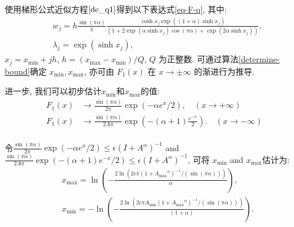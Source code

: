 使用梯形公式近似方程$\eqref{de_q1}$得到以下表达式\eqref{eq-F-q}, 其中: 
\begin{equation}
	\begin{aligned}
		&w_j=h\frac{\sin(\pi \alpha)}{\pi}\frac{\cosh x_j\exp((1+\alpha)\sinh x_j )}{(1+2\exp(\alpha \sinh x_j)\cos(\pi\alpha)+\exp(2\alpha\sinh x_j))},\\
		&\lambda_j=\exp(\sinh x_j),
	\end{aligned}
	\label{lw_DE_q1}
\end{equation}
$x_j=x_{\min}+jh$, $h=(x_{\max}-x_{\min})/Q$, $Q$ 为正整数. 可通过算法\ref{determine-bound}确定 $x_{\min}, x_{\max}$, 亦可由 $F_1(x)$ 在 $x\to\pm\infty$ 的渐进行为推导. 

进一步, 我们可以初步估计$x_{
	\min}$和$x_{\max}$的值: 
\begin{equation}
	\begin{aligned}
		F_1\left( x \right) &
		\rightarrow \frac{\sin(\pi \alpha)}{2\pi} \exp \left(  -\alpha  e^x /2\right),
		\quad (x \rightarrow +\infty)\\
		F_1\left( x \right) &
		\rightarrow
		\frac{\sin(\pi \alpha)}{2 A \pi} \exp \left(-(\alpha+1) \frac{e^{-x}}{2}\right).
		\quad (x \rightarrow -\infty)\\
	\end{aligned}
\end{equation}

令$ \frac{\sin(\pi \alpha)}{2\pi} \exp \left(  -\alpha e^x /2\right) \leq \epsilon  (I+{A}^{\alpha})^{-1}$ and $\frac{\sin(\pi \alpha)}{2 A\pi} \exp \left(-(\alpha+1) e^{-x}/2\right) \leq \epsilon  (I+{A}^{\alpha})^{-1}$, 可将 $x_{\min}$ and $x_{\max}$估计为:
\begin{equation}
	\begin{aligned}
		&x_{\max}=\ln\left(-\frac{2\ln(2\epsilon \pi (1+{A_{\max}}^{\alpha})^{-1}/(\sin(\pi \alpha)))}{ \alpha}\right),\\
		&x_{\min}=-\ln\left(-\frac{2\ln(2\epsilon \pi A_{\min}  (1+{A_{\max}}^{\alpha})^{-1}/(\sin(\pi \alpha)))}{(1+\alpha)}\right).
	\end{aligned}
	\label{findminmax_DE_q1}
\end{equation}

